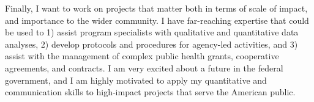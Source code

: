 \documentclass[11pt, a4paper]{maedbh-cv}
\begin{document}
\begin{cvletter}
	Finally, I want to work on projects that matter both in terms of scale of impact, and importance to the wider community. I have far-reaching expertise that could be used to 1) assist program specialists with qualitative and quantitative data analyses, 2) develop protocols and procedures for agency-led activities, and 3) assist with the management of complex public health grants, cooperative agreements, and contracts. I am very excited about a future in the federal government, and I am highly motivated to apply my quantitative and communication skills to high‐impact projects that serve the American public. 

\end{cvletter}

\makeletterclosing
\end{document}
